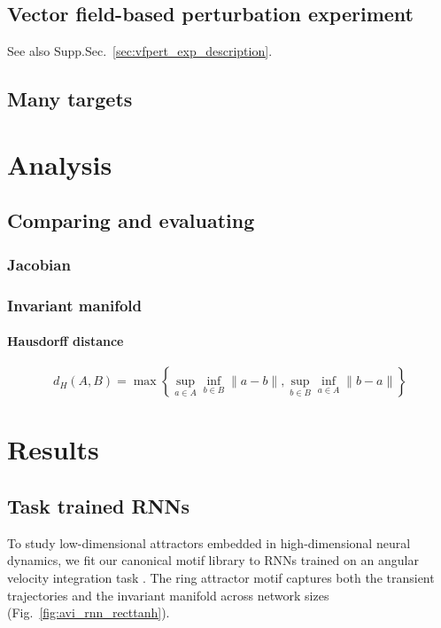 \documentclass{article}
\theoremstyle{definition} \newtheorem{definition}{Definition}  \newtheorem{example}{Example}
\theoremstyle{remark} \newtheorem{remark}{Remark}
\newcounter{ct}
\begin{document}
\subsection{Vector field-based perturbation experiment}\label{sec:vfpert_exp_details}
See also Supp.Sec.~\ref{sec:vfpert_exp_description}.


\subsection{Many targets}\label{sec:manytargets_exp_details}



\newpage
\section{Analysis}

\subsection{Comparing and evaluating}

\subsubsection{Jacobian}


\subsubsection{Invariant manifold}
\paragraph{Hausdorff distance}
\[
d_H(A, B) = \max\left\{ \sup_{a \in A} \inf_{b \in B} \|a - b\|, \sup_{b \in B} \inf_{a \in A} \|b - a\| \right\}
\]





\newpage
\section{Results}
\subsection{Task trained RNNs}
To study low-dimensional attractors embedded in high-dimensional neural dynamics, we fit our canonical motif library to RNNs trained on an angular velocity integration task \citep{Sagodi2024a}. The ring attractor motif captures both the transient trajectories and the invariant manifold across network sizes (Fig.~\ref{fig:avi_rnn_recttanh}).
\end{document}
